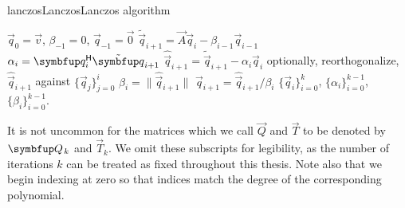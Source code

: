 \begin{labelalgorithm}[H]{lanczos}{Lanczos}{Lanczos algorithm}
\begin{algorithmic}[1]
    \State \( \vec{q}_0 = \vec{v} \), \( \beta_{-1} = 0 \), \( \vec{q}_{-1} = \vec{0} \)%
        \State \( \tilde{\vec{q}}_{i+1} = \vec{A} \vec{q}_{i} - \beta_{i-1} \vec{q}_{i-1} \)
        \State \( \alpha_{i} = \vec{q}_i^\cT \tilde{\vec{q}}_{i+1} \)
        \State \( \hat{\vec{q}}_{i+1} = \tilde{\vec{q}}_{i+1} - \alpha_{i} \vec{q}_i \)
        \State optionally, reorthogonalize,  \( \hat{\vec{q}}_{i+1} \) against \( \{\vec{q}_j\}_{j=0}^{i} \)
        \State \( \beta_{i} = \| \hat{\vec{q}}_{i+1} \| \)
        \State \( \vec{q}_{i+1} = \hat{\vec{q}}_{i+1} / \beta_{i} \)
    \EndFor
    \State \Return \( \{ \vec{q}_i \}_{i=0}^{k} \), \( \{ \alpha_i \}_{i=0}^{k-1} \), \( \{ \beta_i \}_{i=0}^{k-1} \).
\EndProcedure
\end{algorithmic}
\end{labelalgorithm}



\begin{remark}
    It is not uncommon for the  matrices which we call \( \vec{Q} \) and \( \vec{T} \) to be denoted by \( \vec{Q}_{\mkern2mu k} \) and \( \vec{T}_k \).
    We omit these subscripts for legibility, as the number of iterations \( k \) can be treated as fixed throughout this thesis.
    Note also that we begin indexing at zero so that indices match the degree of the corresponding polynomial.
\end{remark}


